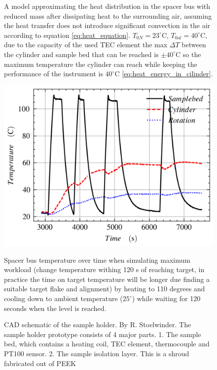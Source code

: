 \documentclass[10pt]{article}
\begin{document}
\begin{figure}[H]
\begin{minipage}[b]{0.45\textwidth}
    \caption{A model approximating the heat distribution in the spacer bus with reduced mass after dissipating heat to the surrounding air, assuming the heat transfer does not introduce significant convection in the air according to equation \ref{eq:heat_equation}. $T_{0N} = 23^\circ$C, $T_{0al} = 40^\circ$C, due to the capacity of the used TEC element the max $\Delta T$ between the cylinder and sample bed that can be reached is $\pm 40^\circ$C so the maximum temperature the cylinder can reach while keeping the performance of the instrument is $40^\circ$C \ref{eq:heat_energy_in_cilinder}.}
  \end{minipage}
\end{figure}


\begin{figure}[H]
  \centering
  \begin{minipage}[b]{0.45\textwidth}
    \includegraphics[width=\textwidth]{img/sample_holder_and_mask/reduced_cylinder_thermocycle.png}
    \caption{Spacer bus temperature over time when simulating maximum workload (change temperature withing 120 s of reaching target, in practice the time on target temperature will be longer due finding a suitable target flake and alignment) by heating to 110 degrees and cooling down to ambient temperature ($25^\circ$) while waiting for 120 seconds when the level is reached.}
    \label{fig:temperature_graph}
  \end{minipage}
  \hfill
  \begin{minipage}[b]{0.45\textwidth}
    \caption{CAD schematic of the sample holder. By R. Stoelwinder. The sample holder prototype consists of 4 major parts. 1. The sample bed, which contains a heating coil, TEC element, thermocouple and PT100 sensor. 2. The sample isolation layer. This is a shroud fabricated out of PEEK}
    \label{fig:CAD_sample_holder}
  \end{minipage}
\end{figure}
\end{document}
